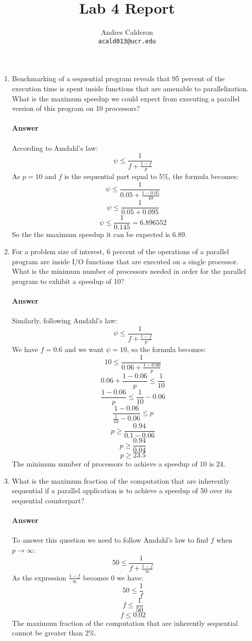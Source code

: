 \documentclass[10pt]{scrartcl}
\title{Lab 4 Report}
\author{
   Andres Calderon\\
  \small \texttt{acald013@ucr.edu}
}
\begin{document}
\maketitle

\begin{enumerate}
 \item Benchmarking of a sequential program reveals that 95 percent of the execution time is spent inside functions that are amenable to parallelization. What is the maximum speedup we could expect from executing a parallel version of this program on 10 processors?\\
 \\ 
 \textbf{Answer}\\
 \\
 According to Amdahl's law:
 $$ \psi \leq \frac{1}{f + \frac{1 - f}{p}} $$
 As $p=10$ and $f$ is the sequential part equal to 5\%, the formula becomes:
 $$ \psi \leq \frac{1}{0.05 + \frac{1 - 0.05}{10}} $$
 $$ \psi \leq \frac{1}{0.05 + 0.095} $$
 $$ \psi \leq \frac{1}{0.145} = 6.896552$$
 So the the maximum speedup it can be expected is $6.89$.
 
 \item For a problem size of interest, 6 percent of the operations of a parallel program are inside I/O functions that are executed on a single processor. What is the minimum number of processors needed in order for the parallel program to exhibit a speedup of 10?\\
 \\ 
 \textbf{Answer}\\
 \\
 Similarly, following Amdahl's law:
 $$ \psi \leq \frac{1}{f + \frac{1 - f}{p}} $$
 We have $f=0.6$ and we want $\psi=10$, so the formula becomes:
 $$ 10 \leq \frac{1}{0.06 + \frac{1 - 0.06}{p}} $$
 $$ 0.06 + \frac{1 - 0.06}{p} \leq \frac{1}{10} $$
 $$ \frac{1 - 0.06}{p} \leq \frac{1}{10} - 0.06 $$
 $$ \frac{1 - 0.06}{\frac{1}{10} - 0.06 } \leq p$$
 $$ p \geq \frac{0.94}{0.1 - 0.06 } $$
 $$ p \geq \frac{0.94}{0.04} $$
 $$ p \geq 23.5 $$
 The minimum number of processors to achieve a speedup of 10 is 24.
 
 \item What is the maximum fraction of the computation that are inherently sequential if a parallel application is to achieve a speedup of 50 over its sequential counterpart?\\
 \\ 
 \textbf{Answer}\\
 \\
 To answer this question we need to follow Amdahl's law to find $f$ when $p \rightarrow \infty$:
 $$ 50 \leq \frac{1}{f + \frac{1 - f}{\infty}} $$
 As the expression $\frac{1 - f}{\infty}$ becomes $0$ we have:
 $$ 50 \leq \frac{1}{f} $$
 $$ f \leq \frac{1}{50} $$
 $$ f \leq 0.02 $$
 The maximum fraction of the computation that are inherently sequential cannot be greater than 2\%. 
 

\end{enumerate}
\end{document}
